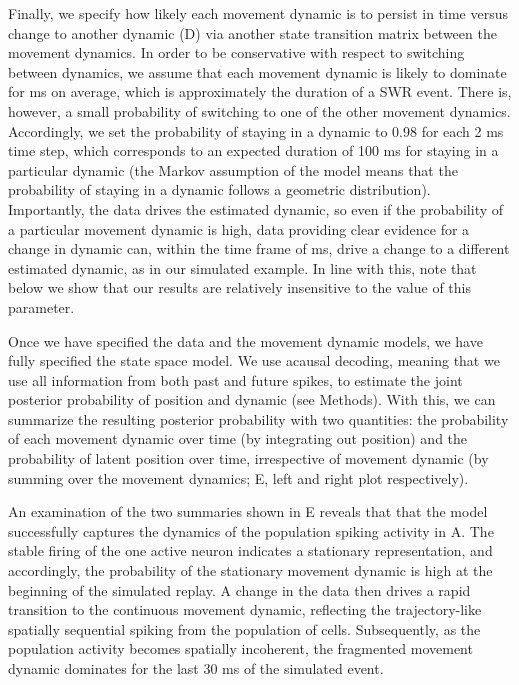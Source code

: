 \documentclass[9pt,lineno]{elife}
\begin{document}
Finally, we specify how likely each movement dynamic is to persist in time versus change to another dynamic (D) via another state transition matrix between the movement dynamics. In order to be conservative with respect to switching between dynamics, we assume that each movement dynamic is likely to dominate for  ms on average, which is approximately the duration of a SWR event. There is, however, a small probability of switching to one of the other movement dynamics. Accordingly, we set the probability of staying in a dynamic to 0.98 for each 2 ms time step, which corresponds to an expected duration of 100 ms for staying in a particular dynamic (the Markov assumption of the model means that the probability of staying in a dynamic follows a geometric distribution). Importantly, the data drives the estimated dynamic, so even if the probability of a particular movement dynamic is high, data providing clear evidence for a change in dynamic can, within the time frame of  ms, drive a change to a different estimated dynamic, as in our simulated example. In line with this, note that below we show that our results are relatively insensitive to the value of this parameter.

Once we have specified the data and the movement dynamic models, we have fully specified the state space model. We use acausal decoding, meaning that we use all information from both past and future spikes, to estimate the joint posterior probability of position and dynamic (see Methods). With this, we can summarize the resulting posterior probability with two quantities: the probability of each movement dynamic over time (by integrating out position) and the probability of latent position over time, irrespective of movement dynamic (by summing over the movement dynamics; E, left and right plot respectively). 

An examination of the two summaries shown in E reveals that that the model successfully captures the dynamics of the population spiking activity in A. The stable firing of the one active neuron indicates a stationary representation, and accordingly, the probability of the stationary movement dynamic is high at the beginning of the simulated replay. A change in the data then drives a rapid transition to the continuous movement dynamic, reflecting the trajectory-like spatially sequential spiking from the population of cells. Subsequently, as the population activity becomes spatially incoherent, the fragmented movement dynamic dominates for the last 30 ms of the simulated event.
\end{document}

